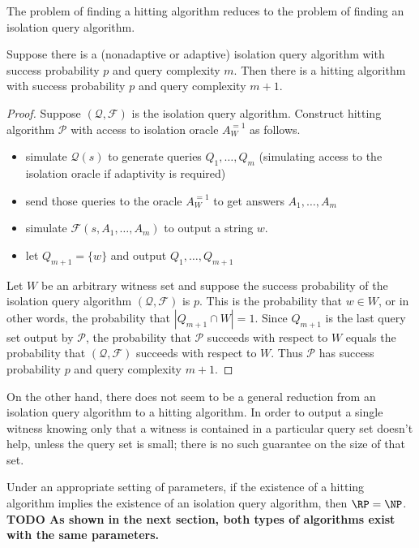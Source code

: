 \documentclass{article}
\newcommand{\todo}[1]{\textbf{TODO #1}}
\newcommand{\mc}{\mathcal}
\begin{document}
The problem of finding a hitting algorithm reduces to the problem of finding an isolation query algorithm.

\begin{lemma}\label{lem:reduction}
  Suppose there is a (nonadaptive or adaptive) isolation query algorithm with success probability $p$ and query complexity $m$.
  Then there is a hitting algorithm with success probability $p$ and query complexity $m + 1$.
\end{lemma}
\begin{proof}
  Suppose $(\mc{Q}, \mc{F})$ is the isolation query algorithm.
  Construct hitting algorithm $\mc{P}$ with access to isolation oracle $A^{=1}_W$ as follows.
  \begin{itemize}
  \item simulate $\mc{Q}(s)$ to generate queries $Q_1, \dotsc, Q_m$ (simulating access to the isolation oracle if adaptivity is required)
  \item send those queries to the oracle $A^{=1}_W$ to get answers $A_1, \dotsc, A_m$
  \item simulate $\mc{F}(s, A_1, \dotsc, A_m)$ to output a string $w$.
  \item let $Q_{m + 1} = \{ w \}$ and output $Q_1, \dotsc, Q_{m + 1}$
  \end{itemize}

  Let $W$ be an arbitrary witness set and suppose the success probability of the isolation query algorithm $(\mc{Q}, \mc{F})$ is $p$.
  This is the probability that $w \in W$, or in other words, the probability that $|Q_{m + 1} \cap W| = 1$.
  Since $Q_{m + 1}$ is the last query set output by $\mc{P}$, the probability that $\mc{P}$ succeeds with respect to $W$ equals the probability that $(\mc{Q}, \mc{F})$ succeeds with respect to $W$.
  Thus $\mc{P}$ has success probability $p$ and query complexity $m + 1$.
\end{proof}

On the other hand, there does not seem to be a general reduction from an isolation query algorithm to a hitting algorithm.
In order to output a single witness knowing only that a witness is contained in a particular query set doesn't help, unless the query set is small; there is no such guarantee on the size of that set.

\begin{conjecture}
  Under an appropriate setting of parameters, if the existence of a hitting algorithm implies the existence of an isolation query algorithm, then $\RP = \NP$.
  \todo{As shown in the next section, both types of algorithms exist with the same parameters.}
\end{conjecture}
\end{document}
